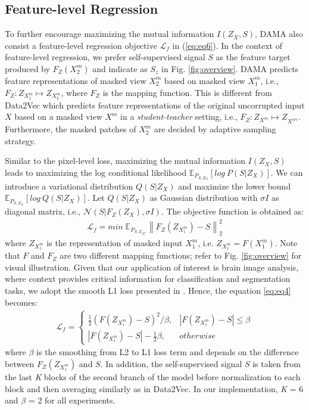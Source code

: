 \documentclass[10pt,twocolumn,letterpaper]{article}
\begin{document}
\subsection{Feature-level Regression}\label{subsec:feature}
To further encourage maximizing the mutual information $I(Z_X,S)$, DAMA also consist a feature-level regression objective $\mathcal L_f$ in (\ref{eq:eq6}). In the context of feature-level regression, we prefer self-supervised signal $S$ as the feature target produced by $F_Z(X_2^m)$ and indicate as $S_z$ in Fig. \ref{fig:overview}. DAMA predicts feature representations of masked view $X_2^m$ based on masked view $X_1^m$, i.e., $F_Z:Z_{X_1^m}\mapsto Z_{X_2^m}$, where $F_Z$ is the mapping function. This is different from Data2Vec \cite{data2vec} which predicts feature representations of the original uncorrupted input $X$ based on a masked view $X^m$ in a \textit{student-teacher} setting, i.e., $F_Z:Z_{X^m}\mapsto Z_{X^{ori}}$. Furthermore, the masked patches of $X_2^m$ are decided by adaptive sampling strategy.

Similar to the pixel-level loss, maximizing the mutual information $I(Z_X,S)$ leads to maximizing the log conditional likelihood $\mathbb{E}_{P_{S,Z_X}}[log\:P(S|Z_X)]$. We can introduce a variational distribution $Q(S|Z_X)$ and maximize the lower bound $\mathbb{E}_{P_{S,Z_X}}[log\:Q(S|Z_X)]$. Let $Q(S|Z_X)$ as Gaussian distribution with $\sigma I$ as diagonal matrix, i.e., $\mathcal N(S|F_Z(Z_X),\sigma I)$. The objective function is obtained as:
\begin{equation}\label{eq:eq4}
\begin{aligned}
\mathcal L_{f} = min\; \mathbb{E}_{P_{S,Z_{X_1^m}}}\left \| F_Z(Z_{X_1^m}) - S \right \|_{2}^{2}
\end{aligned}
\end{equation}
where $Z_{X_1^m}$ is the representation of masked input $X_1^m$, i.e. $Z_{X_1^m}=F(X_1^m)$. Note that $F$ and $F_Z$ are two different mapping functions; refer to Fig. \ref{fig:overview} for visual illustration. Given that our application of interest is brain image analysis, where context provides critical information for classification and segmentation tasks, we adopt the smooth L1 loss presented in \cite{data2vec}. Hence, the equation \eqref{eq:eq4} becomes:
\begin{equation}\label{eq:eq5}
\begin{aligned}
\mathcal L_{f} =  \begin{cases} 
\frac{1}{2}(F(Z_{X_1^m})-S)^2/\beta, & \left |F(Z_{X_1^m}) - S\right |\leq \beta \\ 
\left |F(Z_{X_1^m}) - S\right| - \frac{1}{2}\beta, & otherwise
\end{cases}
\end{aligned}
\end{equation}
where $\beta$ is the smoothing from L2 to L1 loss term and depends on the difference between $F_Z(Z_{X_1^m})$ and $S$. In addition, the self-supervised signal $S$ is taken from the last \textit{K} blocks of the second branch of the model before normalization to each block and then averaging similarly as in Data2Vec. In our implementation, \textit{K} =  6 and $\beta$ = 2 for all experiments.
\end{document}
